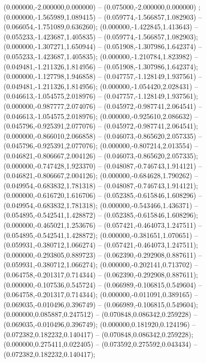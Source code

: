  (0.000000,-2.000000,0.000000) -- (0.075000,-2.000000,0.000000) ;
 (0.000000,-1.565989,1.089415) -- (0.059774,-1.566857,1.082903) -- (0.066054,-1.751089,0.636260);
 (0.000000,-1.422845,1.413643) -- (0.055233,-1.423687,1.405835) -- (0.059774,-1.566857,1.082903);
 (0.000000,-1.307271,1.650944) -- (0.051908,-1.307986,1.642374) -- (0.055233,-1.423687,1.405835);
 (0.000000,-1.210784,1.823982) -- (0.049481,-1.211326,1.814956) -- (0.051908,-1.307986,1.642374);
 (0.000000,-1.127798,1.946858) -- (0.047757,-1.128149,1.937561) -- (0.049481,-1.211326,1.814956);
 (0.000000,-1.054420,2.028431) -- (0.046613,-1.054575,2.018976) -- (0.047757,-1.128149,1.937561);
 (0.000000,-0.987777,2.074076) -- (0.045972,-0.987741,2.064541) -- (0.046613,-1.054575,2.018976);
 (0.000000,-0.925610,2.086632) -- (0.045796,-0.925391,2.077076) -- (0.045972,-0.987741,2.064541);
 (0.000000,-0.866010,2.066858) -- (0.046073,-0.865620,2.057335) -- (0.045796,-0.925391,2.077076);
 (0.000000,-0.807214,2.013554) -- (0.046821,-0.806667,2.004126) -- (0.046073,-0.865620,2.057335);
 (0.000000,-0.747428,1.923370) -- (0.048087,-0.746743,1.914121) -- (0.046821,-0.806667,2.004126);
 (0.000000,-0.684628,1.790262) -- (0.049954,-0.683832,1.781318) -- (0.048087,-0.746743,1.914121);
 (0.000000,-0.616720,1.616706) -- (0.052385,-0.615846,1.608296) -- (0.049954,-0.683832,1.781318);
 (0.000000,-0.543466,1.436371) -- (0.054895,-0.542541,1.428872) -- (0.052385,-0.615846,1.608296);
 (0.000000,-0.465021,1.253676) -- (0.057421,-0.464073,1.247511) -- (0.054895,-0.542541,1.428872);
 (0.000000,-0.381651,1.070651) -- (0.059931,-0.380712,1.066274) -- (0.057421,-0.464073,1.247511);
 (0.000000,-0.293805,0.889723) -- (0.062390,-0.292908,0.887611) -- (0.059931,-0.380712,1.066274);
 (0.000000,-0.202141,0.713702) -- (0.064758,-0.201317,0.714344) -- (0.062390,-0.292908,0.887611);
 (0.000000,-0.107536,0.545724) -- (0.066989,-0.106815,0.549604) -- (0.064758,-0.201317,0.714344);
 (0.000000,-0.011091,0.389165) -- (0.069035,-0.010496,0.396749) -- (0.066989,-0.106815,0.549604);
 (0.000000,0.085887,0.247512) -- (0.070848,0.086342,0.259228) -- (0.069035,-0.010496,0.396749);
 (0.000000,0.181920,0.124196) -- (0.072382,0.182232,0.140417) -- (0.070848,0.086342,0.259228);
 (0.000000,0.275411,0.022405) -- (0.073592,0.275592,0.043434) -- (0.072382,0.182232,0.140417);

